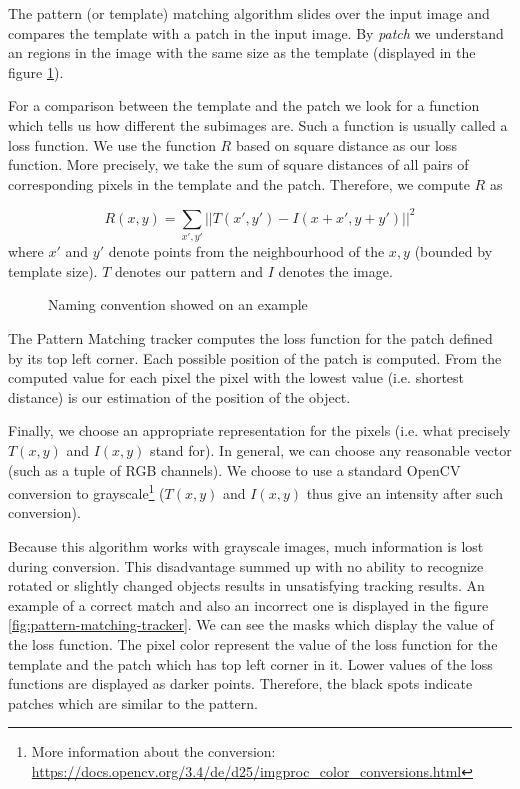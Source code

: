 The pattern (or template) matching algorithm slides over the input image and
compares the template with a patch in the input image. By \emph{patch} we
understand an regions in the image with the same size as the template (displayed in the figure
\ref{fig:patternmatching-naming}).

For a comparison between the template and the patch we look for a function which
tells us how different the subimages are. Such a function is usually called
a loss function. We use the function $R$ based on square distance as our loss
function. More precisely, we take the sum of square distances of all pairs of
corresponding pixels in the template and the patch. Therefore, we compute $R$
as

$$
R(x, y) =
\sum_{x', y'} ||T(x', y') - I(x + x', y + y')||^2
$$
where $x'$ and $y'$ denote points from the neighbourhood of the $x, y$ (bounded by template size).
$T$ denotes our pattern and $I$ denotes the image.

\begin{figure}[h]
	\centering
	\def\svgwidth{0.9\linewidth}
	
	\caption{Naming convention showed on an example}
	\label{fig:patternmatching-naming}
\end{figure}

The Pattern Matching tracker computes the loss function for the patch defined
by its top left corner. Each possible position of the patch is computed.
From the computed value for each pixel the pixel with the lowest value
(i.e. shortest distance) is our estimation of the position of the object.

Finally, we choose an appropriate representation for the pixels (i.e. what
precisely $T(x, y)$ and $I(x, y)$ stand for). In general, we can choose any
reasonable vector (such as a tuple of RGB channels). We choose to use a
standard OpenCV conversion to grayscale\footnote{More information about the
conversion:
\url{https://docs.opencv.org/3.4/de/d25/imgproc\_color\_conversions.html}}
($T(x, y)$ and $I(x, y)$ thus give an intensity after such conversion).

Because this algorithm works with grayscale images, much information is
lost during conversion. This disadvantage summed up with no ability to
recognize rotated or slightly changed objects results in unsatisfying tracking
results. An example of a correct match and also an incorrect one is displayed in the
figure \ref{fig:pattern-matching-tracker}. We can see the masks which display
the value of the loss function. The pixel color represent the value of the loss
function for the template and the patch which has top left corner in it. Lower
values of the loss functions are displayed as darker points. Therefore, the
black spots indicate patches which are similar to the pattern.

